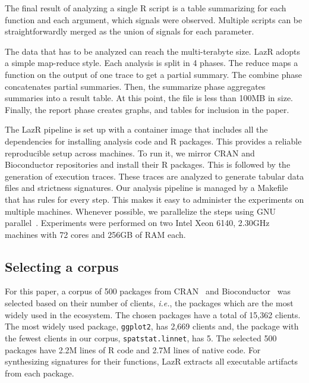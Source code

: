\documentclass[review,nonacm,screen,acmsmall,anonymous=true]{acmart}
\renewcommand{\c}[1]{\lstinline |#1|\xspace}
\newcommand{\lazr}{{\sf LazR}\xspace}
\begin{document}
The final result of analyzing a single R script is a table summarizing for each
function and each argument, which signals were observed. Multiple scripts can be
straightforwardly merged as the union of signals for each parameter.

The data that has to be analyzed can reach the multi-terabyte size. \lazr adopts
a simple map-reduce style. Each analysis is split in 4 phases. The reduce maps
a function on the output of one trace to get a partial summary. The combine
phase concatenates partial summaries. Then, the summarize phase aggregates
summaries into a result table. At this point, the file is less than 100MB in
size. Finally, the report phase creates graphs, and tables for inclusion in
the paper.

The \lazr pipeline is set up with a container image that includes all the
dependencies for installing analysis code and R packages. This provides a
reliable reproducible setup across machines. To run it, we mirror CRAN and
Bioconductor repositories and install their R packages. This is followed by the
generation of execution traces. These traces are analyzed to generate tabular
data files and strictness signatures. Our analysis pipeline is managed by a
Makefile that has rules for every step. This makes it easy to administer the
experiments on multiple machines. Whenever possible, we parallelize the steps
using GNU parallel~\cite{gnuparallel}. Experiments were performed on two Intel
Xeon 6140, 2.30GHz machines with 72 cores and 256GB of RAM each.

\subsection{Selecting a corpus}\label{sec:corpus}

For this paper, a corpus of 500 packages from CRAN~\cite{ligges2017} and
Bioconductor~\cite{bioc} was selected based on their number of clients,
\emph{i.e.}, the packages which are the most widely used in the ecosystem. The
chosen packages have a total of 15,362 clients. The most widely used package,
\c{ggplot2}, has 2,669 clients and, the package with the fewest clients in our
corpus, \c{spatstat.linnet}, has 5. The selected 500 packages have 2.2M lines of
R code and 2.7M lines of native code. For synthesizing signatures for their
functions, \lazr extracts all executable artifacts from each package.
\end{document}
